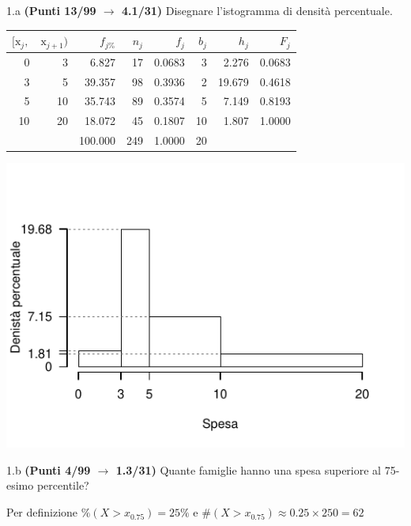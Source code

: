 \documentclass[
  11pt,
]{book}
\theoremstyle{mytheoremstyle}
\theoremstyle{mydefstyle}
\newenvironment{sol}
  {
  \begin{tcolorbox}[enhanced,breakable,arc=0.1mm,boxrule=1pt,colback=white,colframe=iblue,
  title=\bf \fontfamily{lmss}\selectfont \hspace{.5 cm} Soluzione,drop fuzzy shadow]

}{
\end{tcolorbox}
  }
\begin{document}
1.a \textbf{(Punti 13/99 \(\rightarrow\) 4.1/31)} Disegnare l'istogramma di densità percentuale.

\begin{sol}

\begin{table}[H]
\centering
\begin{tabular}{rrrrrrrr}
\toprule
$[\text{x}_j,$ & $\text{x}_{j+1})$ & $f_{j\%}$ & $n_j$ & $f_j$ & $b_j$ & $h_j$ & $F_j$\\
\midrule
0 & 3 & 6.827 & 17 & 0.0683 & 3 & 2.276 & 0.0683\\
3 & 5 & 39.357 & 98 & 0.3936 & 2 & 19.679 & 0.4618\\
5 & 10 & 35.743 & 89 & 0.3574 & 5 & 7.149 & 0.8193\\
10 & 20 & 18.072 & 45 & 0.1807 & 10 & 1.807 & 1.0000\\
 &  & 100.000 & 249 & 1.0000 & 20 &  & \\
\bottomrule
\end{tabular}
\end{table}

\begin{center}\includegraphics{Esami_passati_con_soluzioni_files/figure-latex/2022-7-1} \end{center}

\end{sol}

1.b \textbf{(Punti 4/99 \(\rightarrow\) 1.3/31)} Quante famiglie hanno una spesa superiore al 75-esimo percentile?

\begin{sol}
Per definizione \(\%(X>x_{0.75})=25\%\) e
\(\#(X>x_{0.75})\approx0.25\times250 =62\)

\end{sol}
\end{document}
